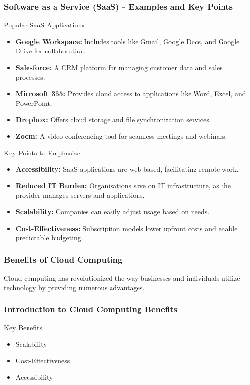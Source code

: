 \documentclass[aspectratio=169]{beamer}
\begin{document}
\begin{frame}[fragile]
    \frametitle{Software as a Service (SaaS) - Examples and Key Points}

    \begin{block}{Popular SaaS Applications}
        \begin{itemize}
            \item \textbf{Google Workspace:} Includes tools like Gmail, Google Docs, and Google Drive for collaboration.
            \item \textbf{Salesforce:} A CRM platform for managing customer data and sales processes.
            \item \textbf{Microsoft 365:} Provides cloud access to applications like Word, Excel, and PowerPoint.
            \item \textbf{Dropbox:} Offers cloud storage and file synchronization services.
            \item \textbf{Zoom:} A video conferencing tool for seamless meetings and webinars.
        \end{itemize}
    \end{block}
    
    \begin{block}{Key Points to Emphasize}
        \begin{itemize}
            \item \textbf{Accessibility:} SaaS applications are web-based, facilitating remote work.
            \item \textbf{Reduced IT Burden:} Organizations save on IT infrastructure, as the provider manages servers and applications.
            \item \textbf{Scalability:} Companies can easily adjust usage based on needs.
            \item \textbf{Cost-Effectiveness:} Subscription models lower upfront costs and enable predictable budgeting.
        \end{itemize}
    \end{block}
\end{frame}

\begin{frame}[fragile]
  \frametitle{Benefits of Cloud Computing}
  Cloud computing has revolutionized the way businesses and individuals utilize technology by providing numerous advantages.
\end{frame}

\begin{frame}[fragile]
  \frametitle{Introduction to Cloud Computing Benefits}
  \begin{block}{Key Benefits}
    \begin{itemize}
      \item Scalability
      \item Cost-Effectiveness
      \item Accessibility
    \end{itemize}
  \end{block}
\end{frame}
\end{document}
